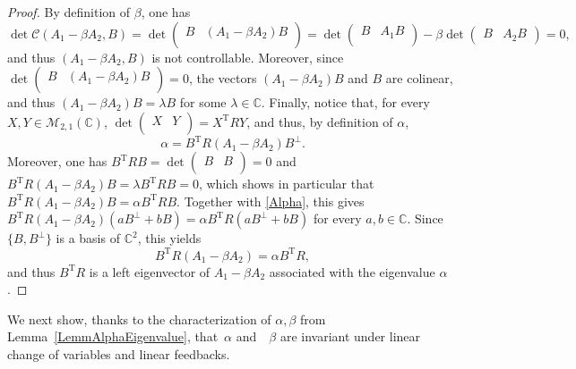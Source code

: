 \documentclass[10pt]{amsart}
\theoremstyle{plain}
\theoremstyle{definition}
\newcommand{\transp}{{\scriptscriptstyle\mathrm{T}}}
\begin{document}
\begin{proof}
By definition of $\beta$, one has
\[\det\mathcal C(A_1 - \beta A_2, B) = \det\begin{pmatrix} B & (A_1 - \beta A_2) B\\\end{pmatrix} = \det\begin{pmatrix} B & A_1 B\\\end{pmatrix} - \beta \det\begin{pmatrix}B & A_2 B\end{pmatrix} = 0,\]
and thus $(A_1 - \beta A_2, B)$ is not controllable. Moreover, since $\det\begin{pmatrix} B & (A_1 - \beta A_2) B\\\end{pmatrix}  = 0$, the vectors $(A_1 - \beta A_2) B$ and $B$ are colinear, and thus $(A_1 - \beta A_2) B = \lambda B$ for some $\lambda \in \mathbb C$. Finally, notice that, for every $X, Y \in \mathcal M_{2, 1}(\mathbb C)$, $\det\begin{pmatrix}X & Y\\\end{pmatrix} = X^\transp R Y$, and thus, by definition of $\alpha$,
\begin{equation}
\label{Alpha}
\alpha = B^\transp R (A_1 - \beta A_2) B^\perp.
\end{equation}
Moreover, one has $B^\transp R B = \det\begin{pmatrix}B & B \\\end{pmatrix} = 0$ and $B^\transp R (A_1 - \beta A_2) B = \lambda B^\transp R B = 0$, which shows in particular that $B^\transp R (A_1 - \beta A_2) B = \alpha B^\transp R B$. Together with \eqref{Alpha}, this gives $B^\transp R (A_1 - \beta A_2) (a B^\perp  + b B) = \alpha B^\transp R (a B^\perp + b B)$ for every $a, b \in \mathbb C$. Since $\{B, B^\perp\}$ is a basis of $\mathbb C^2$, this yields
\[B^\transp R (A_1 - \beta A_2) = \alpha B^\transp R,\]
and thus $B^\transp R$ is a left eigenvector of $A_1 - \beta A_2$ associated with the eigenvalue $\alpha$.
\end{proof}

We next show, thanks to the characterization of $\alpha, \beta$ from Lemma~\ref{LemmAlphaEigenvalue}, that~$\alpha$ and~ $\beta$ are invariant under linear change of variables and linear feedbacks.
\end{document}
